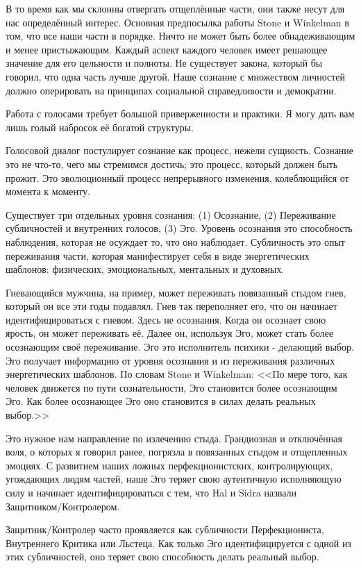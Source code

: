 \documentclass[10pt, fleqn]{article}
\begin{document}
В то время как мы склонны отвергать отщеплённые части, они также несут для нас определённый интерес. Основная предпосылка работы Stone и Winkelman в том, что все наши части в порядке. Ничто не может быть более обнадеживающим и менее пристыжающим. Каждый аспект каждого человек имеет решающее значение для его цельности и полноты. Не существует закона, который бы говорил, что одна часть лучше другой. Наше сознание с множеством личностей должно оперировать на принципах социальной справедливости и демократии.

Работа с голосами требует большой приверженности и практики. Я могу дать вам лишь голый набросок её богатой структуры.

Голосовой диалог постулирует сознание как процесс, нежели сущность. Сознание это не что-то, чего мы стремимся достичь; это процесс, который должен быть прожит. Это эволюционный процесс непрерывного изменения, колеблющийся от момента к моменту.

Существует три отдельных уровня сознания: (1) Осознание, (2) Переживание субличностей и внутренних голосов, (3) Эго. Уровень осознания это способность наблюдения, которая не осуждает то, что оно наблюдает. Субличность это опыт переживания части, которая манифестирует себя в виде энергетических шаблонов: физических, эмоциональных, ментальных и духовных.

Гневающийся мужчина, на пример, может переживать повязанный стыдом гнев, который он все эти годы подавлял. Гнев так переполняет его, что он начинает идентифицироваться с гневом. Здесь не осознания. Когда он осознает свою ярость, он может переживать её. Далее он, используя Эго, может стать более осознающим своё переживание. Эго это исполнитель психики - делающий выбор. Эго получает информацию от уровня осознания и из переживания различных энергетических шаблонов. По словам Stone и Winkelman: <<По мере того, как человек движется по пути сознательности, Эго становится более осознающим Эго. Как более осознающее Эго оно становится в силах делать реальных выбор.>>

Это нужное нам направление по излечению стыда. Грандиозная и отключённая воля, о которых я говорил ранее, погрязла в повязанных стыдом и отщепленных эмоциях. С развитием наших ложных перфекционистских, контролирующих, угождающих людям частей, наше Эго теряет свою аутентичную исполняющую силу и начинает идентифицироваться с тем, что Hal и Sidra назвали Защитником/Контролером.


Защитник/Контролер часто проявляется как субличности Перфекциониста, Внутреннего Критика или Льстеца. Как только Эго идентифицируется с одной из этих субличностей, оно теряет свою способность делать реальный выбор.
\end{document}
